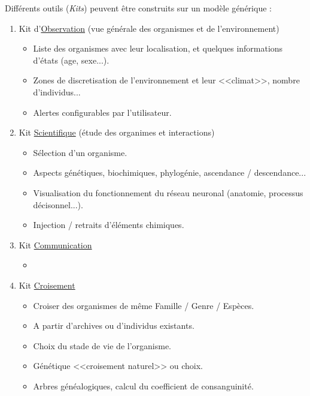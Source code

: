 \documentclass[11pt,twoside,a4paper]{article}
\begin{document}
Diff{\'e}rents outils (\emph{Kits}) peuvent {\^e}tre construits sur un mod{\`e}le g{\'e}n{\'e}rique : 
\begin{enumerate}
	\item Kit d'\underline{Observation} (vue g{\'e}n{\'e}rale des organismes et de l'environnement)
	\begin{itemize}
		\item Liste des organismes avec leur localisation, et quelques informations d'{\'e}tats (age, sexe...).
		\item Zones de discretisation de l'environnement et leur <<climat>>, nombre d'individus...
		\item Alertes configurables par l'utilisateur. 
	\end{itemize}
	\item Kit \underline{Scientifique} ({\'e}tude des organimes et interactions)
	\begin{itemize}
		\item S{\'e}lection d'un organisme. 
		\item Aspects g{\'e}n{\'e}tiques, biochimiques, phylog{\'e}nie, ascendance / descendance...
		\item Visualisation du fonctionnement du r{\'e}seau neuronal (anatomie, processus d{\'e}cisonnel...). 
		\item Injection / retraits d'{\'e}l{\'e}ments chimiques. 
	\end{itemize}
	\item Kit \underline{Communication}
	\begin{itemize}
		\item 
	\end{itemize}
	\item Kit \underline{Croisement}
	\begin{itemize}
		\item Croiser des organismes de m{\^e}me Famille / Genre / Esp{\`e}ces. 
		\item A partir d'archives ou d'individus existants. 
		\item Choix du stade de vie de l'organisme. 
		\item G{\'e}n{\'e}tique <<croisement naturel>> ou choix. 
		\item Arbres g{\'e}n{\'e}alogiques, calcul du coefficient de consanguinit{\'e}. 
	\end{itemize}
\end{enumerate}
\end{document}
